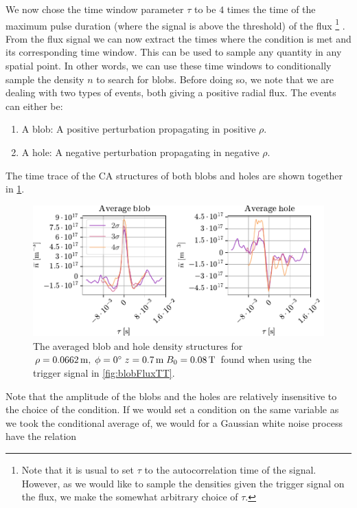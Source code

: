 We now chose the time window parameter $\tau$ to be $4$ times the time of the maximum pulse duration (where the signal is above the threshold) of the flux%
\footnote{Note that it is usual to set $\tau$ to the autocorrelation time of the signal.
    However, as we would like to sample the densities given the trigger signal on the flux, we make the somewhat arbitrary choice of $\tau$.
}%
.
From the flux signal we can now extract the times where the condition is met and its corresponding time window.
This can be used to sample any quantity in any spatial point.
In other words, we can use these time windows to conditionally sample the density $n$ to search for blobs.
Before doing so, we note that we are dealing with two types of events, both giving a positive radial flux.
The events can either be:
%
\begin{enumerate}[noitemsep]
    \item A blob: A positive perturbation propagating in positive $\rho$.
    \item A hole: A negative perturbation propagating in negative $\rho$.
\end{enumerate}
%
The time trace of the CA structures of both blobs and holes are shown together in \cref{fig:blobAndHoleTT}.
%
\begin{figure}[htb]
    \begin{center}
        \includegraphics{fig/results/blobs/blobsAndHoles-B0_008Tweak}
    \end{center}
    \caption{The averaged blob and hole density structures for $\rho=0.0662\, \text{m},\;\phi=0^{\circ}\;z=0.7\, \text{m}\;B_0=0.08\, \text{T}$ found when using the trigger signal in \cref{fig:blobFluxTT}.}
    \label{fig:blobAndHoleTT}
\end{figure}
%
Note that the amplitude of the blobs and the holes are relatively insensitive to the choice of the condition.
If we would set a condition on the same variable as we took the conditional average of, we would for a Gaussian white noise process have the relation \cite{Edwards1983}
